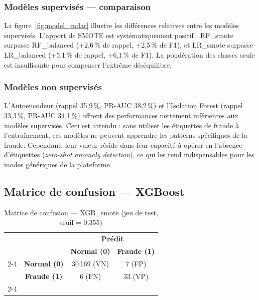 \documentclass[12pt,a4paper,twoside]{report}
\theoremstyle{definition}
\begin{document}
\subsubsection{Modèles supervisés — comparaison}

La figure~\ref{fig:model_radar} illustre les différences relatives entre les modèles
supervisés. L'apport de SMOTE est systématiquement positif : RF\_smote surpasse
RF\_balanced (+2,6\,\% de rappel, +2,5\,\% de F1), et LR\_smote surpasse
LR\_balanced (+5,1\,\% de rappel, +6,1\,\% de F1). La pondération des classes
seule est insuffisante pour compenser l'extrême déséquilibre.


\subsubsection{Modèles non supervisés}

L'Autoencodeur (rappel 35,9\,\%, PR-AUC 38,2\,\%) et l'Isolation Forest
(rappel 33,3\,\%, PR-AUC 34,1\,\%) offrent des performances nettement inférieures
aux modèles supervisés. Ceci est attendu : sans utiliser les étiquettes de fraude
à l'entraînement, ces modèles ne peuvent apprendre les patterns spécifiques de la
fraude. Cependant, leur valeur réside dans leur capacité à opérer en l'absence
d'étiquettes (\textit{zero-shot anomaly detection}), ce qui les rend indispensables
pour les modes génériques de la plateforme.

\subsection{Matrice de confusion — XGBoost}

\begin{table}[H]
\centering
\caption{Matrice de confusion — XGB\_smote (jeu de test, seuil = 0,355)}
\label{tab:confusion_matrix}
\renewcommand{\arraystretch}{1.5}
\begin{tabular}{cc|cc}
\multicolumn{2}{c}{} & \multicolumn{2}{c}{\textbf{Prédit}} \\
\multicolumn{2}{c|}{} & \textbf{Normal (0)} & \textbf{Fraude (1)} \\
\cline{2-4}
\multirow{2}{*}{\textbf{Réel}} &
\textbf{Normal (0)} & \cellcolor{green!20}30\,169 (VN) & \cellcolor{red!15}7 (FP) \\
& \textbf{Fraude (1)} & \cellcolor{red!15}6 (FN) & \cellcolor{green!20}33 (VP) \\
\cline{2-4}
\end{tabular}
\end{table}
\end{document}

